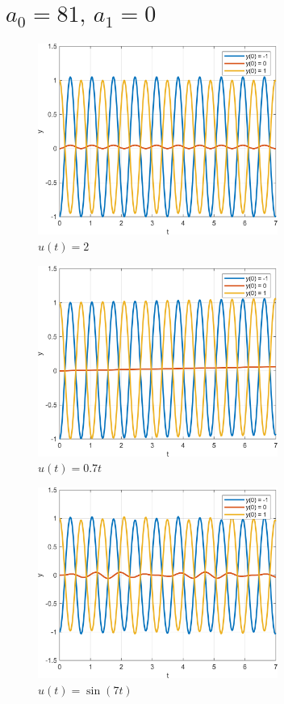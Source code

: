 \section{$a_0 = 81,\, a_1 = 0$}

\begin{figure}[ht]
    \centering
    \includegraphics[width=0.7\textwidth, trim={0cm 0cm 0cm 0cm}]{../images/2_1.png}
    \caption{$u(t) = 2$}
    \label{fig:2_1}
\end{figure}

\begin{figure}[ht]
    \centering
    \includegraphics[width=0.7\textwidth, trim={0cm 0cm 0cm 0cm}]{../images/2_2.png}
    \caption{$u(t) = 0.7t$}
    \label{fig:2_2}
\end{figure}

\begin{figure}[ht]
    \centering
    \includegraphics[width=0.7\textwidth, trim={0cm 0cm 0cm 0cm}]{../images/2_3.png}
    \caption{$u(t) = \sin(7t)$}
    \label{fig:2_3}
\end{figure}
 
